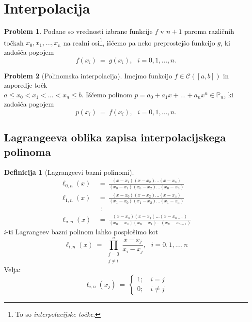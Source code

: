 \documentclass[11pt]{article}
\newcommand{\p}{\mathbb{P}}
\newcommand{\C}{\mathcal{C}}
\theoremstyle{definition}
\newtheorem{definicija}{Definicija}[section]
\theoremstyle{definition}
\newtheorem{problem}{Problem}[section]
\begin{document}
\pagebreak


\section{Interpolacija}
\vspace{0.5cm}

\begin{problem}

Podane so vrednosti izbrane funkcije $f$ v $n+1$ paroma različnih točkah $x_0, x_1, \ldots, x_n$ na realni osi\footnote{To so \textit{interpolacijske točke}.}, iščemo pa neko preprostejšo funkcijo $g$, ki zadošča pogojem
$$f(x_i) ~=~ g(x_i), ~~~i = 0, 1, \ldots, n.$$

\end{problem}
\vspace{0.5cm}

\begin{problem}[Polinomska interpolacija]

Imejmo funkcijo $f \in \C([a, b])$ in zaporedje točk \\$a \leq x_0 < x_1 < \ldots < x_n \leq b$. Iščemo polinom $p = a_0 + a_1 x + \ldots + a_n x^n \in \p_n$, ki zadošča pogojem
$$p(x_i) ~=~ f(x_i), ~~~i = 0, 1, \ldots, n.$$

\end{problem}
\vspace{0.5cm}


\subsection{Lagrangeeva oblika zapisa interpolacijskega polinoma}
\vspace{0.5cm}

\begin{definicija}[Lagrangeevi bazni polinomi]

\begin{align*}
\ell_{0, n}(x) ~&=~ \frac{(x-x_1)(x-x_2)\ldots(x-x_n)}{(x_0-x_1)(x_0-x_2)\ldots(x_0-x_n)}\\
\ell_{1, n}(x) ~&=~ \frac{(x-x_0)(x-x_2)\ldots(x-x_n)}{(x_1-x_0)(x_1-x_2)\ldots(x_1-x_n)}\\
&~~\vdots \\
\ell_{n, n}(x) ~&=~ \frac{(x-x_0)(x-x_1)\ldots(x-x_{n-1})}{(x_n-x_0)(x_n-x_1)\ldots(x_n-x_{n-1})}
\end{align*}
$i$-ti Lagrangeev bazni polinom lahko posplošimo kot
$$\ell_{i, n}(x) ~=~ \prod_{\substack{j=0 \\ j \neq i}}^n \frac{x-x_j}{x_i-x_j}, ~~~i = 0, 1, \ldots, n$$
Velja:
$$\ell_{i, n}(x_j) ~=~ \begin{cases}
1; ~&i=j \\
0; ~&i \neq j
\end{cases}$$

\end{definicija}
\vspace{0.5cm}
\end{document}
